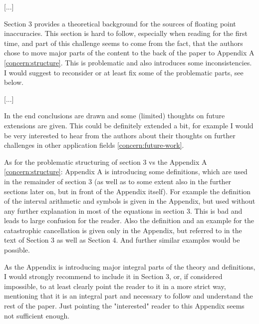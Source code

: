 \documentclass{article}
\begin{document}
[...]

Section 3 provides a theoretical background for the sources of floating point inaccuracies.
This section is hard to follow, especially when reading for the first time, and part of this challenge seems to come from the fact, that the authors chose to move major parts of the content to the back of the paper to Appendix A \eqref{concern:structure}.
This is problematic and also introduces some inconsistencies.
I would suggest to reconsider or at least fix some of the problematic parts, see below.



[...]

In the end conclusions are drawn and some (limited) thoughts on future extensions are given.
This could be definitely extended a bit, for example I would be very interested to hear from the authors about their thoughts on further challenges in other application fields \eqref{concern:future-work}.

As for the problematic structuring of section 3 vs the Appendix A \eqref{concern:structure}: 
Appendix A is introducing some definitions, which are used in the remainder of section 3 (as well as to some extent also in the further sections later on, but in front of the Appendix itself). 
For example the definition of the interval arithmetic and symbols is given in the Appendix, but used without any further explanation in most of the equations in section 3.
This is bad and leads to large confusion for the reader.
Also the definition and an example for the catastrophic cancellation is given only in the Appendix, but referred to in the text of Section 3 as well as Section 4.
And further similar examples would be possible.

As the Appendix is introducing major integral parts of the theory and definitions, I would strongly recommend to include it in Section 3, or, if considered impossible, to at least clearly point the reader to it in a more strict way, mentioning that it is an integral part and necessary to follow and understand the rest of the paper.
Just pointing the "interested" reader to this Appendix seems not sufficient enough.
\end{document}
